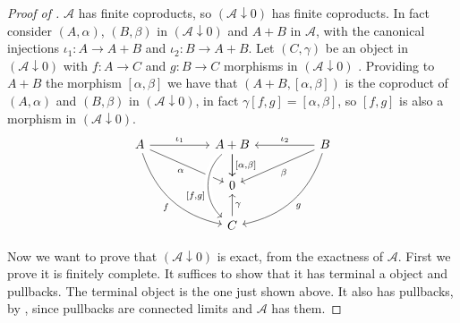 \begin{subbox}{}
\begin{proof}[\textit{Proof of }]
        $\mathcal{A}$ has finite coproducts, so $(\mathcal{A} \downarrow 0)$ has finite coproducts. In fact consider $(A,\alpha)$, $(B,\beta)$ in $(\mathcal{A} \downarrow 0)$ and $A+B$ in $\mathcal{A}$, with the canonical injections $\iota_1 : A \to A+B$ and $\iota_2 : B \to A+B$. Let $(C,\gamma)$ be an object in $(\mathcal{A}\downarrow 0)$ with $f:A \to C$ and $g:B \to C$ morphisms in $(\mathcal{A}\downarrow 0)$ . Providing to $A+B$ the morphism $[\alpha,\beta]$ we have that $(A+B, [\alpha,\beta])$ is the coproduct of $(A,\alpha)$ and $(B,\beta)$ in $(\mathcal{A} \downarrow 0)$, in fact $\gamma [f,g] = [\alpha,\beta]$, so $[f,g]$ is also a morphism in $(\mathcal{A}\downarrow 0)$.
        \[
\begin{tikzcd}
    A \arrow[rr, "\iota_1"] \arrow[rrdd, "f"', bend right] \arrow[rrd, "\alpha"'] &  & A+B \arrow[d] \arrow[d, "{[\alpha,\beta]}"] &  & B \arrow[ll, "\iota_2"'] \arrow[lldd, "g", bend left] \arrow[lld, "\beta"] \\
                                                                                  &  & 0                                                                                 &  &                                                                            \\
                                                                                  &  & C \arrow[u, "\gamma"']  \arrow[from=uu, "{[f,g]}"', bend right=49, crossing over, pos=0.54]                                                          &  &                                                                           
    \end{tikzcd}
    \]

    Now we want to prove that $(\mathcal{A} \downarrow 0)$ is exact, from the exactness of $\mathcal{A}$.
    First we prove it is finitely complete. It suffices to show that it has terminal a object and pullbacks. The terminal object is the one just shown above. It also has pullbacks, by , since pullbacks are connected limits and $\mathcal{A}$ has them.


\end{proof}
\end{subbox}
